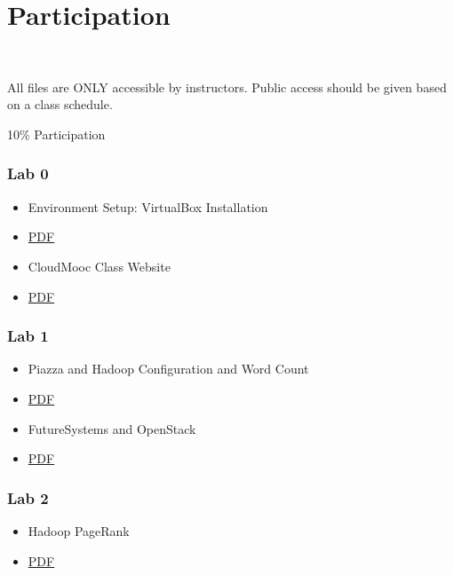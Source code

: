 \chapter{Participation}\label{participation}

\FILENAME\

All files are ONLY accessible by instructors. Public access
  should be given based on a class schedule.

10\% Participation

\subsection{Lab 0}\label{lab-0}

\begin{itemize}
\item
  Environment Setup: VirtualBox Installation
\item
  \href{https://drive.google.com/open?id=0B88HKpainTSfRFgwX0IxaWM5TFE}{PDF}
\item
  CloudMooc Class Website
\item
  \href{https://drive.google.com/open?id=0B88HKpainTSfS3hNb2tVSW9GcE0}{PDF}
\end{itemize}

\subsection{Lab 1}\label{lab-1}

\begin{itemize}
\item
  Piazza and Hadoop Configuration and Word Count
\item
  \href{https://drive.google.com/open?id=0B88HKpainTSfMzVSa1pYM0tfMzg}{PDF}
\item
  FutureSystems and OpenStack
\item
  \href{https://drive.google.com/open?id=0B88HKpainTSfNEhmeHBveXRSSUk}{PDF}
\end{itemize}

\subsection{Lab 2}\label{lab-2}

\begin{itemize}
\item
  Hadoop PageRank
\item
  \href{https://drive.google.com/open?id=0B88HKpainTSfTWhTaEs0R05RRkE}{PDF}
\end{itemize}

